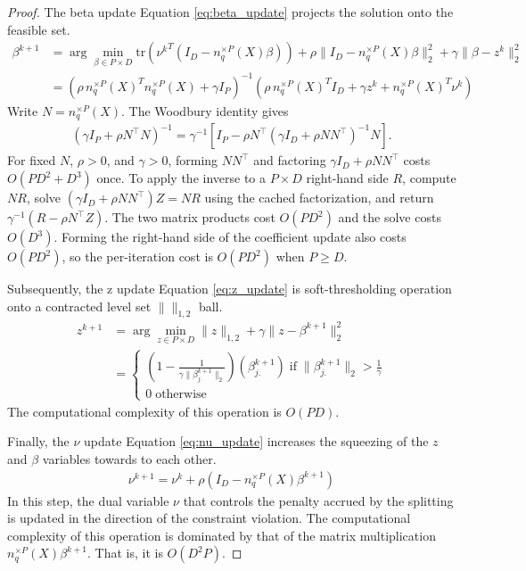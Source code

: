 \begin{proof}
The beta update Equation \ref{eq:beta_update} projects the solution onto the feasible set.
\begin{align}
    \label{eq:beta_update}
    \beta^{k+1} &= \arg \min_{\beta \in P \times D}  \text{tr}({\nu^k}^T (I_D - n_q^{\times P}(X) \beta)) + \rho \|I_D - n_q^{\times P}(X) \beta\|_2^2 + \gamma \|\beta - z^k\|_2^2 \\
    &= (\rho \, n_q^{\times P}(X)^T n_q^{\times P}(X) + \gamma I_P)^{-1} (\rho \, n_q^{\times P}(X)^T I_D + \gamma z^k + n_q^{\times P}(X)^T \nu^k)
    \end{align}
Write $N=n_q^{\times P}(X)$.
The Woodbury identity gives
\begin{align}
(\gamma I_P+\rho N^\top N)^{-1}
=\gamma^{-1}\left[I_P-\rho N^\top
(\gamma I_D+\rho NN^\top)^{-1}N\right].
\end{align}
For fixed $N$, $\rho>0$, and $\gamma>0$, forming $NN^\top$ and factoring $\gamma I_D+\rho NN^\top$ costs $O(PD^2+D^3)$ once.
To apply the inverse to a $P\times D$ right-hand side $R$, compute $NR$, solve $(\gamma I_D+\rho NN^\top)Z=NR$ using the cached factorization, and return $\gamma^{-1}(R-\rho N^\top Z)$.
The two matrix products cost $O(PD^2)$ and the solve costs $O(D^3)$.
Forming the right-hand side of the coefficient update also costs $O(PD^2)$, so the per-iteration cost is $O(PD^2)$ when $P\geq D$.

Subsequently, the z update Equation \ref{eq:z_update} is soft-thresholding operation onto a contracted level set $\|\|_{1,2}$ ball.
\begin{align}
    \label{eq:z_update}
    z^{k+1} &= \arg \min_{z \in P \times D} \|z\|_{1,2} + \gamma \|z - \beta^{k+1}\|_2^2 \\
    &= \begin{cases} (1 - \frac{1}{\gamma\|\beta_{j.}^{k+1}\|_2}) (\beta_{j.}^{k+1}) \; \text{if} \; \|\beta_{j.}^{k+1}\|_2 > \frac{1}{\gamma}\\
        0 \; \text{otherwise}
    \end{cases}
\end{align}
The computational complexity of this operation is $O(PD)$.

Finally, the $\nu$ update Equation \ref{eq:nu_update} increases the squeezing of the $z$ and $\beta$ variables towards to each other.
\begin{align}
\nu^{k+1} = \nu^k + \rho (I_D - n_q^{\times P}(X) \beta^{k+1})
\label{eq:nu_update}
\end{align}
In this step, the dual variable $\nu$ that controls the penalty accrued by the splitting is updated in the direction of the constraint violation.
The computational complexity of this operation is dominated by that of the matrix multiplication $n_q^{\times P}(X) \beta^{k+1}$.
That is, it is $O(D^2P)$.
\end{proof}


